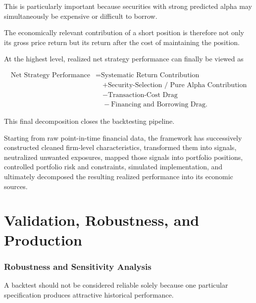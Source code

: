 \documentclass[11pt,a4paper]{article}
\begin{document}
This is particularly important because securities with strong predicted alpha
may simultaneously be expensive or difficult to borrow.

The economically relevant contribution of a short position is therefore not
only its gross price return but its return after the cost of maintaining the
position.

At the highest level, realized net strategy performance can finally be viewed
as

\begin{equation}
\boxed{
\begin{aligned}
\text{Net Strategy Performance}
&=
\text{Systematic Return Contribution}
\\
&\quad+
\text{Security-Selection / Pure Alpha Contribution}
\\
&\quad-
\text{Transaction-Cost Drag}
\\
&\quad-
\text{Financing and Borrowing Drag}.
\end{aligned}
}
\end{equation}

This final decomposition closes the backtesting pipeline.

Starting from raw point-in-time financial data, the framework has successively
constructed cleaned firm-level characteristics, transformed them into signals,
neutralized unwanted exposures, mapped those signals into portfolio positions,
controlled portfolio risk and constraints, simulated implementation, and
ultimately decomposed the resulting realized performance into its economic
sources.


\part{Validation, Robustness, and Production}


\section{Robustness and Sensitivity Analysis}
\label{sec:robustness_sensitivity}

A backtest should not be considered reliable solely because one particular
specification produces attractive historical performance.
\end{document}
